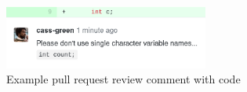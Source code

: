 \begin{figure}[b]
\centering
\includegraphics[width=0.6\textwidth]{Chapter-5/images/review_comment.png}
\caption{Example pull request review comment with code}
\label{fig:review-comment}
\end{figure}